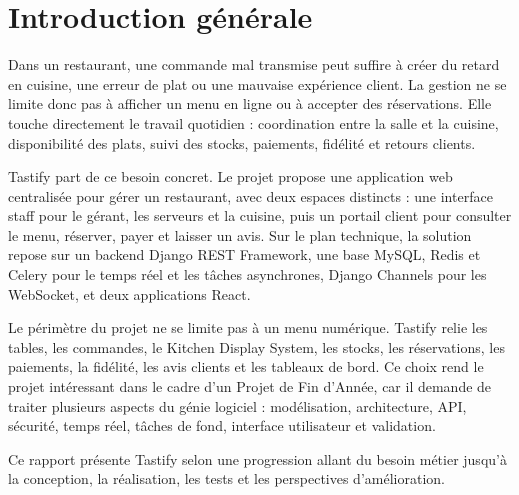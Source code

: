 \chapter*{Introduction générale}

Dans un restaurant, une commande mal transmise peut suffire à créer du retard en cuisine, une erreur de plat ou une mauvaise expérience client. La gestion ne se limite donc pas à afficher un menu en ligne ou à accepter des réservations. Elle touche directement le travail quotidien : coordination entre la salle et la cuisine, disponibilité des plats, suivi des stocks, paiements, fidélité et retours clients.

Tastify part de ce besoin concret. Le projet propose une application web centralisée pour gérer un restaurant, avec deux espaces distincts : une interface staff pour le gérant, les serveurs et la cuisine, puis un portail client pour consulter le menu, réserver, payer et laisser un avis. Sur le plan technique, la solution repose sur un backend Django REST Framework, une base MySQL, Redis et Celery pour le temps réel et les tâches asynchrones, Django Channels pour les WebSocket, et deux applications React.

Le périmètre du projet ne se limite pas à un menu numérique. Tastify relie les tables, les commandes, le Kitchen Display System, les stocks, les réservations, les paiements, la fidélité, les avis clients et les tableaux de bord. Ce choix rend le projet intéressant dans le cadre d'un Projet de Fin d'Année, car il demande de traiter plusieurs aspects du génie logiciel : modélisation, architecture, API, sécurité, temps réel, tâches de fond, interface utilisateur et validation.

Ce rapport présente Tastify selon une progression allant du besoin métier jusqu’à la conception, la réalisation, les tests et les perspectives d’amélioration.
